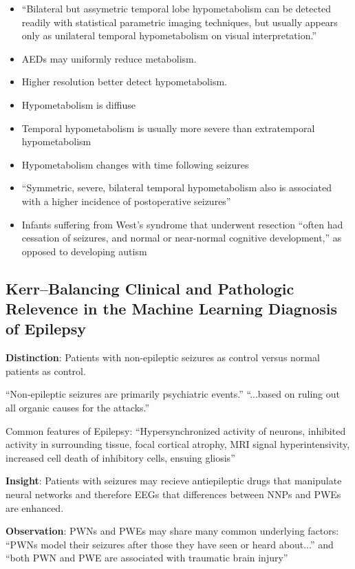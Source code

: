 \documentclass{article}
\begin{document}
\begin{itemize}
\item ``Bilateral but assymetric temporal lobe hypometabolism can be
detected readily with statistical parametric imaging techniques, but usually
appears only as unilateral temporal hypometabolism on visual interpretation.''
\item AEDs may uniformly reduce metabolism. 
\item Higher resolution better detect hypometabolism.
\item Hypometabolism is diffiuse
\item Temporal hypometabolism is usually more severe than extratemporal
hypometabolism
\item Hypometabolism changes with time following seizures
\item ``Symmetric, severe, bilateral temporal hypometabolism also is associated
with a higher incidence of postoperative seizures''
\item Infants suffering from West's syndrome that underwent resection ``often
had cessation of seizures, and normal or near-normal cognitive development,'' as
opposed to developing autism

\end{itemize}

\subsection{Kerr--Balancing Clinical and Pathologic Relevence in the Machine Learning
Diagnosis of Epilepsy}
\textbf{Distinction}: Patients with non-epileptic seizures as control versus
normal patients as control.

``Non-epileptic seizures are primarily psychiatric events.'' ``...based on
ruling out all organic causes for the attacks.''


Common features of Epilepsy: ``Hypersynchronized activity of neurons, inhibited
activity in surrounding tissue, focal cortical atrophy, MRI signal
hyperintensivity, increased cell death of inhibitory cells, ensuing gliosis''

\textbf{Insight}: Patients with seizures may recieve antiepileptic drugs that manipulate
neural networks and therefore EEGs that differences between NNPs and PWEs are
enhanced.

\textbf{Observation}: PWNs and PWEs may share many common underlying factors: ``PWNs
model their seizures after those they have seen or heard about...'' and ``both
PWN and PWE are associated with traumatic brain injury''
\end{document}
